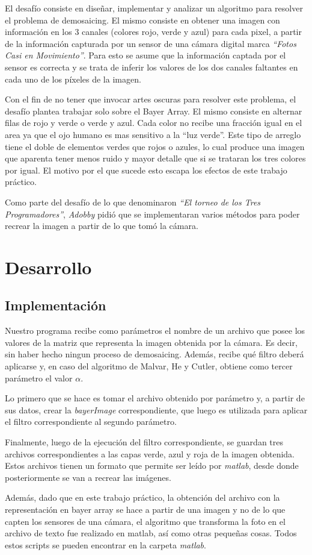 \par 
El desafío consiste en diseñar, implementar y analizar un algoritmo para resolver el
problema de demosaicing. El mismo consiste en obtener una imagen con información en los 3 canales (colores rojo, verde y azul) para cada pixel, a partir de la información capturada por un sensor de una cámara digital marca \textit{``Fotos Casi en Movimiento''}. Para esto se asume que la información captada por el sensor es
correcta y se trata de inferir los valores de los dos canales faltantes en cada uno de los píxeles de la imagen.
\par 
Con el fin de no tener que invocar artes oscuras para resolver este problema, el desafío plantea trabajar solo sobre el Bayer Array. El mismo consiste en alternar filas de rojo y verde o verde y azul. Cada color no recibe una fracción igual en el area ya que el ojo humano es mas sensitivo a la ``luz verde''. Este tipo de arreglo tiene el doble de elementos verdes que rojos o azules, lo cual produce una imagen que aparenta tener menos ruido y mayor detalle que si se trataran los tres colores por igual. El motivo por el que sucede esto escapa los efectos de este trabajo práctico.
\par 
Como parte del desafío de lo que denominaron \textit{``El torneo de los Tres Programadores''}, \textit{Adobby} pidió que se implementaran varios métodos para poder recrear la imagen a partir de lo que tomó la cámara.


\section{Desarrollo}

\subsection{Implementación}


Nuestro programa recibe como parámetros el nombre de un archivo que posee los valores de la matriz que representa la imagen obtenida por la cámara. Es decir, sin haber hecho ningun proceso de demosaicing. Además, recibe qué filtro deberá aplicarse y, en caso del algoritmo de Malvar, He y Cutler, obtiene como tercer parámetro el valor \textbf{$\alpha$}.
\par 
Lo primero que se hace es tomar el archivo obtenido por parámetro y, a partir de sus datos, crear la \textit{bayerImage} correspondiente, que luego es utilizada para aplicar el filtro correspondiente al segundo parámetro.
\par 
Finalmente, luego de la ejecución del filtro correspondiente, se guardan tres archivos correspondientes a las capas verde, azul y roja de la imagen obtenida. Estos archivos tienen un formato que permite ser leído por \textit{matlab}, desde donde posteriormente se van a recrear las imágenes.
\par 
Además, dado que en este trabajo práctico, la obtención del archivo con la representación en bayer array se hace a partir de una imagen y no de lo que capten los sensores de una cámara, el algoritmo que transforma la foto en el archivo de texto fue realizado en matlab, así como otras pequeñas cosas. Todos estos scripts se pueden encontrar en la carpeta \textit{matlab}.

